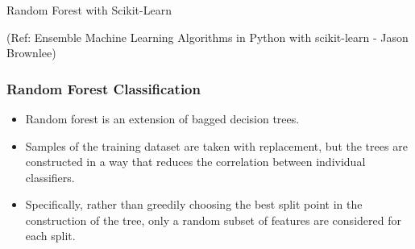 \begin{frame}[fragile]\frametitle{}
\begin{center}
{\Large Random Forest with Scikit-Learn}

{\tiny (Ref: Ensemble Machine Learning Algorithms in Python with scikit-learn - Jason Brownlee)}
\end{center}
\end{frame}







\begin{frame}[fragile]\frametitle{Random Forest Classification}

	\begin{itemize}
	\item Random forest is an extension of bagged decision trees.
	\item Samples of the training dataset are taken with replacement, but the trees are constructed in a way that reduces the correlation between individual classifiers. 
	\item Specifically, rather than greedily choosing the best split point in the construction of the tree, only a random subset of features are considered for each split.
	\end{itemize}
	
\end{frame}


